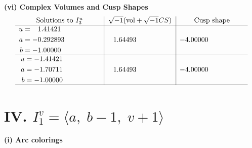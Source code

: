 \documentclass[1p]{elsarticle_modified}
\theoremstyle{definition}
\newcommand{\I}{\sqrt{-1}}
\begin{document}
\newpage\flushleft \textbf{(vi) Complex Volumes and Cusp Shapes}
$$\begin{array}{c|c|c}  
\text{Solutions to }I^u_{3}& \I (\text{vol} + \sqrt{-1}CS) & \text{Cusp shape}\\
 \hline 
\begin{aligned}
u &= \phantom{-}1.41421\phantom{ +0.000000I} \\
a &= -0.292893\phantom{ +0.000000I} \\
b &= -1.00000\phantom{ +0.000000I}\end{aligned}
 & \phantom{-}1.64493\phantom{ +0.000000I} & -4.00000\phantom{ +0.000000I} \\ \hline\begin{aligned}
u &= -1.41421\phantom{ +0.000000I} \\
a &= -1.70711\phantom{ +0.000000I} \\
b &= -1.00000\phantom{ +0.000000I}\end{aligned}
 & \phantom{-}1.64493\phantom{ +0.000000I} & -4.00000\phantom{ +0.000000I}\\
 \hline 
 \end{array}$$\newpage\newpage\renewcommand{\arraystretch}{1}
\centering \section*{IV. $I^v_{1}= \langle a,\;b-1,\;v+1 \rangle$}
\flushleft \textbf{(i) Arc colorings}\\
\end{document}
